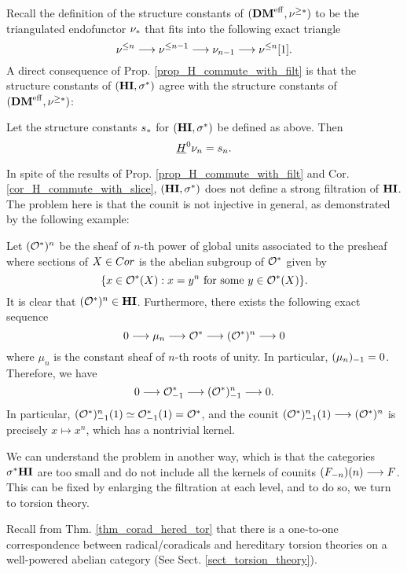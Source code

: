 Recall the definition of the structure constants of $(\DMeff, 
\sgDM{*})$ to be the triangulated endofunctor $\sliceDM{*}$ that
fits into the following exact triangle
\[
\slDM{n} \to \slDM{n - 1} \to \sliceDM{n - 1} \to \slDM{n}[1].
\]
A direct consequence of Prop. \ref{prop_H_commute_with_filt} is 
that the structure constants of $(\HI, \sgHI{*})$ agree with the 
structure constants of $(\DMeff, \sgDM{*})$:

\begin{cor}\label{cor_H_commute_with_slice}
Let the structure constants $\slice{*}$ for $(\HI, \sgHI{*})$ be 
defined as above. Then
\[
\sheaf{H}^0 \sliceDM{n} = \slice{n}.
\]
\end{cor}


In spite of the results of Prop. \ref{prop_H_commute_with_filt} 
and Cor. \ref{cor_H_commute_with_slice}, $(\HI, \sgHI{*})$ does 
not define a strong filtration of $\HI$. The problem here is 
that the counit is not injective in general, as demonstrated by 
the following example: 

\begin{ex}\label{ex_Oxn}
Let $(\Ox)^n$ be the sheaf of $n$-th power of global units 
associated to the presheaf where sections of $X \in \Cor$ is the 
abelian subgroup of $\Ox$ given by 
\[
\{x \in \Ox(X) : x=y^n\textrm{ for some }y \in \Ox(X)\}.
\]
It is clear that $(\Ox)^n \in \HI$. Furthermore, there exists the 
following exact sequence 
\[
0 \to \mu_n \to \Ox \to (\Ox)^n \to 0
\]
where $\mu_n$ is the constant sheaf of $n$-th roots of unity.
In particular, $\RHI{(\mu_n)} = 0$. Therefore, we have
\[
0 \to \RHI{\Ox} \to \RHI{(\Ox)^{n}} \to 0.
\]
In particular, $\LHI{\RHI{(\Ox)^n}} \simeq \LHI{\RHI{\Ox}} = \Ox$, 
and the counit $\LHI{\RHI{(\Ox)^n}} \to (\Ox)^n$ is precisely $x 
\mapsto x^n$, which has a nontrivial kernel.
\end{ex}
\vskip 10pt
We can understand the problem in another way, which is that the 
categories $\sgHI{*}\HI$ are too small and do not include all
the kernels of counits $\LHI[n]{(\RHI[n]{F})} \to F$. This can be 
fixed by enlarging the filtration at each level, and to do so, we 
turn to torsion theory.

Recall from Thm. \ref{thm_corad_hered_tor} that there is a 
one-to-one correspondence between radical/coradicals and hereditary
torsion theories on a well-powered abelian category (See Sect.
\ref{sect_torsion_theory}).

